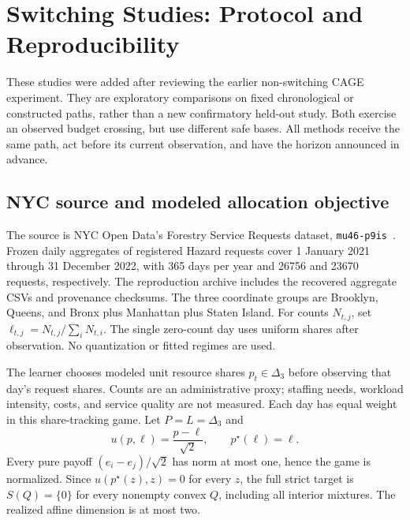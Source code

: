 \providecommand{\AAMASExperimentFigureDir}{figures}

\section{Switching Studies: Protocol and Reproducibility}
\label{sec:supp-switching}

These studies were added after reviewing the earlier non-switching CAGE
experiment. They are exploratory comparisons on fixed chronological or
constructed paths, rather than a new confirmatory held-out study.
Both exercise an observed budget crossing, but use different safe bases.
All methods receive the same path, act before its current observation,
and have the horizon announced in advance.

\subsection{NYC source and modeled allocation objective}
The source is NYC Open Data's Forestry Service Requests dataset,
\texttt{mu46-p9is}~\cite{nycforestry2026}. Frozen daily aggregates of registered
Hazard requests cover 1 January 2021 through 31 December 2022, with 365 days
per year and 26756 and 23670 requests, respectively. The reproduction archive
includes the recovered aggregate CSVs and provenance checksums.
The three coordinate groups are Brooklyn, Queens, and Bronx plus Manhattan
plus Staten Island. For counts $N_{t,j}$, set
$\ell_{t,j}=N_{t,j}/\sum_iN_{t,i}$. The single zero-count day uses uniform
shares after observation. No quantization or fitted regimes are used.

The learner chooses modeled unit resource shares $p_t\in\Delta_3$ before
observing that day's request shares. Counts are an administrative proxy;
staffing needs, workload intensity, costs, and service quality are not
measured. Each day has equal weight in this share-tracking game.
Let $P=L=\Delta_3$ and
\[
 u(p,\ell)=\frac{p-\ell}{\sqrt2},\qquad p^\star(\ell)=\ell.
\]
Every pure payoff $(e_i-e_j)/\sqrt2$ has norm at most one, hence the game is
normalized. Since $u(p^\star(z),z)=0$ for every $z$, the full strict target
is $S(Q)=\{0\}$ for every nonempty convex $Q$, including all interior
mixtures. The realized affine dimension is at most two.

